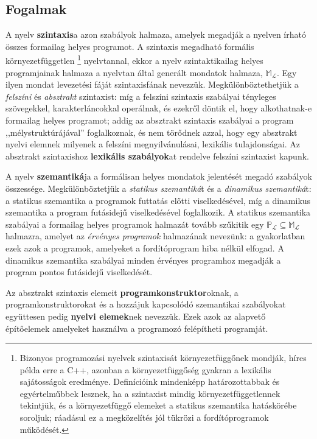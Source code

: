\subsection{Fogalmak}
A nyelv \textbf{szintaxis}a azon szabályok halmaza, amelyek megadják a nyelven írható összes formailag helyes programot. A szintaxis megadható formális környezetfüggetlen%
\footnote{
	Bizonyos programozási nyelvek szintaxisát környezetfüggőnek mondják, híres példa erre a C++, azonban a környezetfüggőség gyakran a lexikális sajátosságok eredménye.
	Definícióink mindenképp határozottabbak és egyértelműbbek lesznek, ha a szintaxist mindig környezetfüggetlennek tekintjük, és a környezetfüggő elemeket a statikus szemantika hatáskörébe soroljuk; ráadásul ez a megközelítés jól tükrözi a fordítóprogramok működését.
}
nyelvtannal\cite[25]{Csornyei}, ekkor a nyelv szintaktikailag helyes programjainak halmaza a nyelvtan által generált mondatok halmaza, $\mathbb{M}_\mathcal{L}$. Egy ilyen mondat levezetési fáját szintaxisfának nevezzük.
Megkülönböztethetjük a \textit{felszíni} és \textit{absztrakt} szintaxist: míg a felszíni szintaxis szabályai tényleges szövegekkel, karakterláncokkal operálnak, és ezekről döntik el, hogy alkothatnak-e formailag helyes programot; addig az absztrakt szintaxis szabályai a program ,,mélystruktúrájával'' foglalkoznak, és nem törődnek azzal, hogy egy absztrakt nyelvi elemnek milyenek a felszíni megnyilvánulásai, lexikális tulajdonságai.
Az absztrakt szintaxishoz \textbf{lexikális szabályok}at rendelve felszíni szintaxist kapunk.

A nyelv \textbf{szemantiká}ja a formálisan helyes mondatok jelentését megadó szabályok összessége.
Megkülönböztetjük a \textit{statikus szemantiká}t és a \textit{dinamikus szemantiká}t: a statikus szemantika a programok futtatás előtti viselkedésével, míg a dinamikus szemantika a program futásidejű viselkedésével foglalkozik.
A statikus szemantika szabályai a formailag helyes programok halmazát tovább szűkitik egy $\mathbb{P}_\mathcal{L} \subseteq \mathbb{M}_\mathcal{L}$ halmazra, amelyet az \textit{érvényes programok} halmazának nevezünk: a gyakorlatban ezek azok a programok, amelyeket a fordítóprogram hiba nélkül elfogad.
A dinamikus szemantika szabályai minden érvényes programhoz megadják a program pontos futásidejű viselkedését.

Az absztrakt szintaxis elemeit \textbf{programkonstruktor}oknak, a programkonstruktorokat és a hozzájuk kapcsolódó szemantikai szabályokat együttesen pedig \textbf{nyelvi elemek}nek nevezzük.
Ezek azok az alapvető építőelemek amelyeket használva a programozó felépítheti programját.

